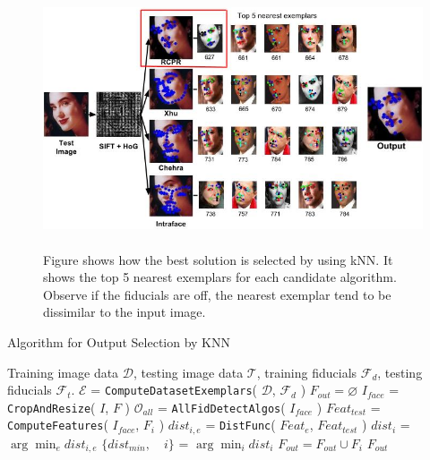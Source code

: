 \label{subsec:output_selection}

\begin{figure}
\includegraphics[width=6in, height=3in]{fid/figures/knn_example.png}
\caption{Figure shows how the best solution is selected by using kNN. It shows the top 5 nearest exemplars for each candidate algorithm. Observe if the fiducials are off, the nearest exemplar tend to be dissimilar to the input image.}
\label{fig:knn_example}
\end{figure}

\begin{algorithm}[!h]
\caption{Algorithm for Output Selection by KNN}
\begin{algorithmic}
  \INPUT Training image data $\mathcal{D}$, testing image data $\mathcal{T}$, training
  fiducials $\mathcal{F}_d$, testing fiducials $\mathcal{F}_t$.
  \STATE $\mathcal{E}$ = {\tt ComputeDatasetExemplars}( $\mathcal{D}$, $\mathcal{F}_d$ )
  \STATE $F_{out} = \varnothing$
    \STATE $I_{face}$ = {\tt CropAndResize}( $I$, $F$ )
    \STATE $\mathcal{O}_{all}$ = {\tt AllFidDetectAlgos}( $I_{face}$ )
      \STATE $Feat_{test}$ = {\tt ComputeFeatures}( $I_{face}$, $F_i$ )
        \STATE $dist_{i, e}$ = {\tt DistFunc}( $Feat_{e}$, $Feat_{test}$ )
      \ENDFOR
      \STATE $dist_i$  = $\arg\min_e dist_{i, e}$
    \ENDFOR
    \STATE $\{ dist_{min}, \quad i \}$ = $\arg\min_i dist_i$
    \STATE $F_{out} = F_{out} \cup F_i$
  \ENDFOR
  \OUTPUT $F_{out}$
\end{algorithmic}
\label{alg:output_selection}
\end{algorithm}

